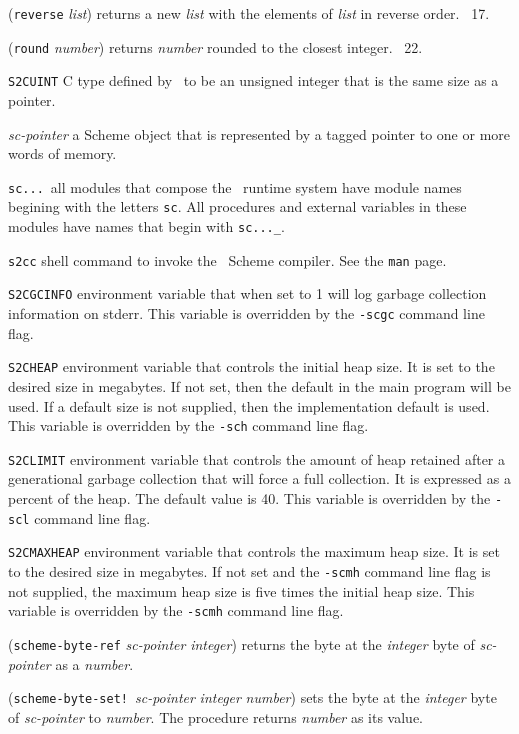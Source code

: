 \documentclass[10pt,twocolumn]{article}
\begin{document}
(\texttt{reverse} \emph{list}) returns a new \emph{list} with the
elements of \emph{list} in reverse order.  \RRRRRS~17.

(\texttt{round} \emph{number}) returns \emph{number} rounded to the
closest integer.  \RRRRRS~22.

\texttt{S2CUINT} C type defined by \StoC\ to be an unsigned integer
that is the same size as a pointer.

\emph{sc-pointer} a Scheme object that is represented by a tagged
pointer to one or more words of memory.

\texttt{sc...}\ all modules that compose the \StoC\ runtime system
have module names begining with the letters \texttt{sc}.  All
procedures and external variables in these modules have names that
begin with \texttt{sc...\_}.

\texttt{s2cc} shell command to invoke the \StoC\ Scheme compiler.  See
the \texttt{man} page.

\texttt{S2CGCINFO} environment variable that when set to 1 will log
garbage collection information on stderr.  This variable is overridden
by the \texttt{-scgc} command line flag.

\texttt{S2CHEAP} environment variable that controls the initial heap
size.  It is set to the desired size in megabytes.  If not set, then
the default in the main program will be used.  If a default size is
not supplied, then the implementation default is used.  This variable
is overridden by the \texttt{-sch} command line flag.

\texttt{S2CLIMIT} environment variable that controls the amount of heap
retained after a generational garbage collection that will force a
full collection.  It is expressed as a percent of the heap.  The
default value is 40.  This variable is overridden by the \texttt{-scl}
command line flag.

\texttt{S2CMAXHEAP} environment variable that controls the maximum heap
size.  It is set to the desired size in megabytes.  If not set and the
\texttt{-scmh} command line flag is not supplied, the maximum heap
size is five times the initial heap size. This variable is overridden
by the \texttt{-scmh} command line flag.

(\texttt{scheme-byte-ref} \emph{sc-pointer} \emph{integer}) returns
the byte at the \emph{integer} byte of \emph{sc-pointer} as a
\emph{number}.

(\texttt{scheme-byte-set!}\ \emph{sc-pointer} \emph{integer}
\emph{number}) sets the byte at the \emph{integer} byte of
\emph{sc-pointer} to \emph{number}.  The procedure returns
\emph{number} as its value.
\end{document}
